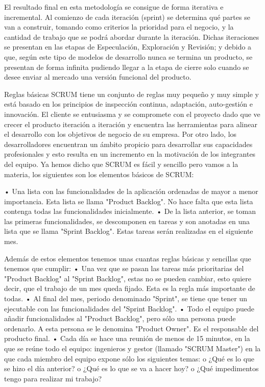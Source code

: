 El resultado final en esta metodología se consigue de forma iterativa e incremental. Al comienzo de cada iteración (sprint) se determina qué partes se van a construir,
tomando como criterios la prioridad para el negocio, y la cantidad de trabajo que se podrá abordar durante la iteración. Dichas iteraciones se presentan en las etapas de
Especulación, Exploración y Revisión; y debido a que, según este tipo de modelos de desarrollo nunca se termina un producto, se presentan de forma infinita pudiendo
llegar a la etapa de cierre solo cuando se desee enviar al mercado una versión funcional del producto.

Reglas básicas
SCRUM tiene un conjunto de reglas muy pequeño y muy simple y está basado en los principios de inspección continua, adaptación, auto-gestión e innovación.
El cliente se entusiasma y se compromete con el proyecto dado que ve crecer el producto iteración a iteración y encuentra las herramientas para alinear el desarrollo
con los objetivos de negocio de su empresa.
Por otro lado, los desarrolladores encuentran un ámbito propicio para desarrollar sus capacidades profesionales y esto resulta en un incremento en la motivación de los
integrantes del equipo.
Ya hemos dicho que SCRUM es fácil y sencillo pero vamos a la materia, los siguientes son los elementos básicos de SCRUM:
    
    •   Una lista con las funcionalidades de la aplicación ordenadas de mayor a menor
        importancia. Esta lista se llama "Product Backlog". No hace falta que esta lista
        contenga todas las funcionalidades inicialmente.
    •   De la lista anterior, se toman las primeras funcionalidades, se descomponen en
        tareas y son anotadas en una lista que se llama "Sprint Backlog". Estas tareas
        serán realizadas en el siguiente mes.

Además de estos elementos tenemos unas cuantas reglas básicas y sencillas que
tenemos que cumplir:
    •   Una vez que se pasan las tareas más prioritarias del "Product Backlog" al
        "Sprint Backlog", estas no se pueden cambiar, esto quiere decir, que el trabajo
        de un mes queda fijado. Esta es la regla más importante de todas.
    •   Al final del mes, periodo denominado "Sprint", se tiene que tener un ejecutable
        con las funcionalidades del "Sprint Backlog".
    •   Todo el equipo puede añadir funcionalidades al "Product Backlog", pero sólo
        una persona puede ordenarlo. A esta persona se le denomina "Product
        Owner". Es el responsable del producto final.
    •   Cada día se hace una reunión de menos de 15 minutos, en la que se reúne
        todo el equipo: ingenieros y gestor (llamado "SCRUM Master") en la que cada
        miembro del equipo expone sólo los siguientes temas:
             o ¿Qué es lo que se hizo el día anterior?
             o ¿Qué es lo que se va a hacer hoy?
             o ¿Qué impedimentos tengo para realizar mi trabajo?


